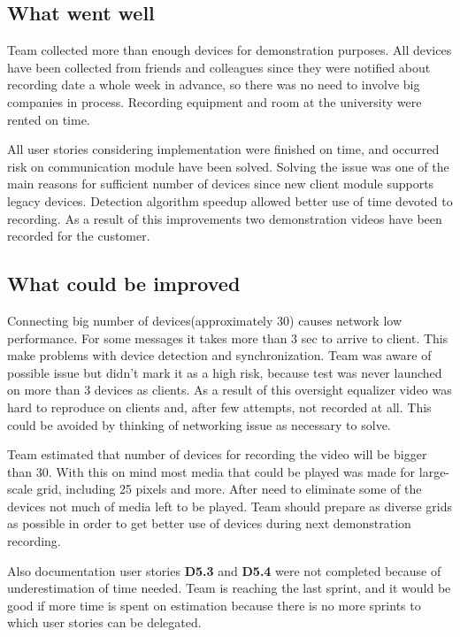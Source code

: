 \subsection{What went well}
Team collected more than enough devices for demonstration purposes. All devices have been collected from friends and colleagues since they were notified about recording date a whole week in advance, so there was no need to involve big companies in process. Recording equipment and room at the university were rented on time. 

All user stories considering implementation were finished on time, and occurred risk on communication module have been solved. Solving the issue was one of the main reasons for sufficient number of devices since new client module supports legacy devices. Detection algorithm speedup allowed better use of time devoted to recording. As a result of this improvements two demonstration videos have been recorded for the customer.


\subsection{What could be improved}
Connecting big number of devices(approximately 30) causes network low performance. For some messages it takes more than 3 sec to arrive to client. This make problems with device detection and synchronization. Team was aware of possible issue but didn't mark it as a high risk, because test was never launched on more than 3 devices as clients. As a result of this oversight equalizer video was hard to reproduce on clients and, after few attempts, not recorded at all. This could be avoided by thinking of networking issue as necessary to solve.

Team estimated that number of devices for recording the video will be bigger than 30. With this on mind most media that could be played was made for large-scale grid, including 25 pixels and more. After need to eliminate some of the devices not much of media left to be played. Team should prepare as diverse grids as possible in order to get better use of devices during next demonstration recording.

Also documentation user stories \textbf{D5.3} and \textbf{D5.4} were not completed because of underestimation of time needed. Team is reaching the last sprint, and it would be good if more time is spent on estimation because there is no more sprints to which user stories can be delegated.   


